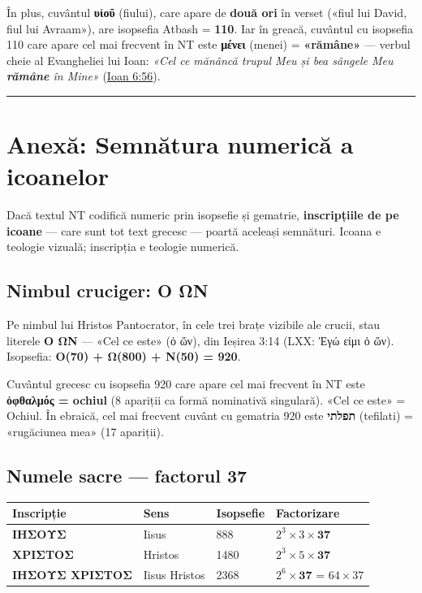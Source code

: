 \documentclass[12pt,a4paper,twoside,openany]{book}
\begin{document}
În plus, cuvântul \textbf{υἱοῦ} (fiului), care apare de \textbf{două ori} în verset («fiul lui David, fiul lui Avraam»), are isopsefia Atbash = \textbf{110}. Iar în greacă, cuvântul cu isopsefia 110 care apare cel mai frecvent în NT este \textbf{μένει} (menei) = \textbf{«rămâne»} --- verbul cheie al Evangheliei lui Ioan: \textit{«Cel ce mănâncă trupul Meu și bea sângele Meu \textbf{rămâne} în Mine»} (\href{https://bibliaortodoxa.ro/carte.php?id=35\&cap=6\#56}{Ioan 6:56}).


\bigskip\noindent\textcolor{darkred}{\rule{\textwidth}{2pt}}\bigskip

\chapter{Anexă: Semnătura numerică a icoanelor}\label{icoane}

Dacă textul NT codifică numeric prin isopsefie și gematrie, \textbf{inscripțiile de pe icoane} --- care sunt tot text grecesc --- poartă aceleași semnături. Icoana e teologie vizuală; inscripția e teologie numerică.

\section*{Nimbul cruciger: Ο ΩΝ}
Pe nimbul lui Hristos Pantocrator, în cele trei brațe vizibile ale crucii, stau literele \textbf{Ο ΩΝ} --- «Cel ce este» (ὁ ὤν), din Ieșirea 3:14 (LXX: Ἐγώ εἰμι ὁ ὤν). Isopsefia: \textbf{Ο(70) + Ω(800) + Ν(50) = 920}.

Cuvântul grecesc cu isopsefia 920 care apare cel mai frecvent în NT este \textbf{ὀφθαλμός = ochiul} (8 apariții ca formă nominativă singulară). «Cel ce este» = Ochiul. În ebraică, cel mai frecvent cuvânt cu gematria 920 este \textbf{תפלתי} (tefilati) = «rugăciunea mea» (17 apariții).

\section*{Numele sacre --- factorul 37}
\begin{center}
\small
\begin{tabular}{L{3.5cm}L{2.5cm}C{1.5cm}L{4cm}}
\toprule
{}
\textbf{Inscripție} & \textbf{Sens} & \textbf{Isopsefie} & \textbf{Factorizare} \\
\midrule
\textbf{ΙΗΣΟΥΣ} & Iisus & 888 & $2^3 \times 3 \times \mathbf{37}$ \\
\textbf{ΧΡΙΣΤΟΣ} & Hristos & 1480 & $2^3 \times 5 \times \mathbf{37}$ \\
\textbf{ΙΗΣΟΥΣ ΧΡΙΣΤΟΣ} & Iisus Hristos & 2368 & $2^6 \times \mathbf{37}$ = $64 \times 37$ \\
\bottomrule
\end{tabular}
\end{center}
\end{document}
